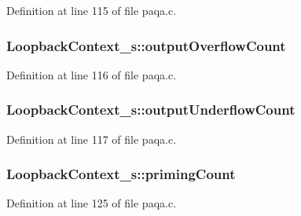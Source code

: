 Definition at line 115 of file paqa.\+c.

\subsubsection[{\texorpdfstring{output\+Overflow\+Count}{outputOverflowCount}}]{ Loopback\+Context\+\_\+s\+::output\+Overflow\+Count}\hypertarget{struct_loopback_context__s_af4dcbf79647e5e12b2ea190604e2446f}{}\label{struct_loopback_context__s_af4dcbf79647e5e12b2ea190604e2446f}


Definition at line 116 of file paqa.\+c.

\subsubsection[{\texorpdfstring{output\+Underflow\+Count}{outputUnderflowCount}}]{ Loopback\+Context\+\_\+s\+::output\+Underflow\+Count}\hypertarget{struct_loopback_context__s_ab7442ac9e2fb4fc8470a99b044ca9c48}{}\label{struct_loopback_context__s_ab7442ac9e2fb4fc8470a99b044ca9c48}


Definition at line 117 of file paqa.\+c.

\subsubsection[{\texorpdfstring{priming\+Count}{primingCount}}]{ Loopback\+Context\+\_\+s\+::priming\+Count}\hypertarget{struct_loopback_context__s_abbc3201a17c8ae320d92963061d0325a}{}\label{struct_loopback_context__s_abbc3201a17c8ae320d92963061d0325a}


Definition at line 125 of file paqa.\+c.


